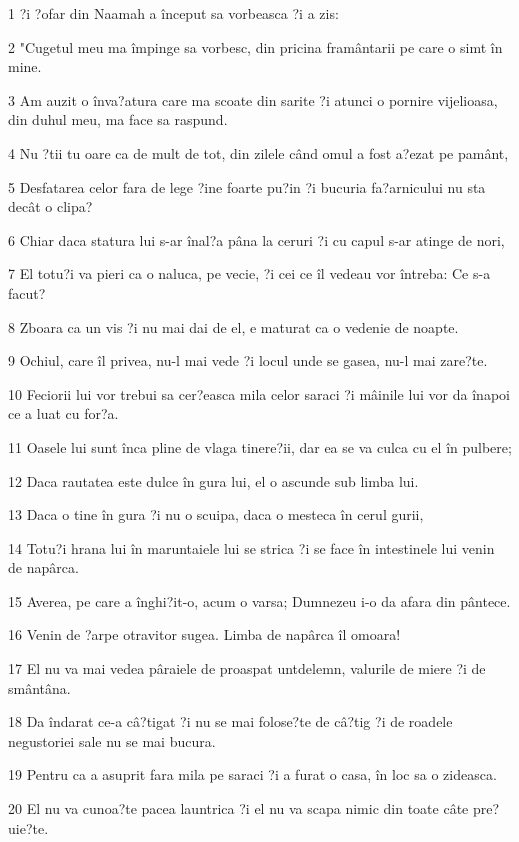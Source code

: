 \par 1 ?i ?ofar din Naamah a început sa vorbeasca ?i a zis:
\par 2 "Cugetul meu ma împinge sa vorbesc, din pricina framântarii pe care o simt în mine.
\par 3 Am auzit o înva?atura care ma scoate din sarite ?i atunci o pornire vijelioasa, din duhul meu, ma face sa raspund.
\par 4 Nu ?tii tu oare ca de mult de tot, din zilele când omul a fost a?ezat pe pamânt,
\par 5 Desfatarea celor fara de lege ?ine foarte pu?in ?i bucuria fa?arnicului nu sta decât o clipa?
\par 6 Chiar daca statura lui s-ar înal?a pâna la ceruri ?i cu capul s-ar atinge de nori,
\par 7 El totu?i va pieri ca o naluca, pe vecie, ?i cei ce îl vedeau vor întreba: Ce s-a facut?
\par 8 Zboara ca un vis ?i nu mai dai de el, e maturat ca o vedenie de noapte.
\par 9 Ochiul, care îl privea, nu-l mai vede ?i locul unde se gasea, nu-l mai zare?te.
\par 10 Feciorii lui vor trebui sa cer?easca mila celor saraci ?i mâinile lui vor da înapoi ce a luat cu for?a.
\par 11 Oasele lui sunt înca pline de vlaga tinere?ii, dar ea se va culca cu el în pulbere;
\par 12 Daca rautatea este dulce în gura lui, el o ascunde sub limba lui.
\par 13 Daca o tine în gura ?i nu o scuipa, daca o mesteca în cerul gurii,
\par 14 Totu?i hrana lui în maruntaiele lui se strica ?i se face în intestinele lui venin de napârca.
\par 15 Averea, pe care a înghi?it-o, acum o varsa; Dumnezeu i-o da afara din pântece.
\par 16 Venin de ?arpe otravitor sugea. Limba de napârca îl omoara!
\par 17 El nu va mai vedea pâraiele de proaspat untdelemn, valurile de miere ?i de smântâna.
\par 18 Da îndarat ce-a câ?tigat ?i nu se mai folose?te de câ?tig ?i de roadele negustoriei sale nu se mai bucura.
\par 19 Pentru ca a asuprit fara mila pe saraci ?i a furat o casa, în loc sa o zideasca.
\par 20 El nu va cunoa?te pacea launtrica ?i el nu va scapa nimic din toate câte pre?uie?te.

